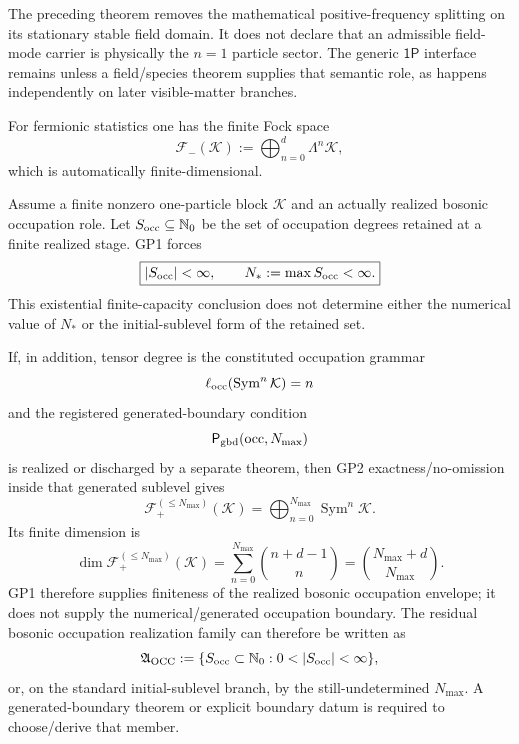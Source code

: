 \documentclass[12pt,a4paper]{article}
\begin{document}




\begin{remark}
The preceding theorem removes the mathematical positive-frequency splitting on
its stationary stable field domain.  It does not declare that an admissible
field-mode carrier is physically the \(n=1\) particle sector.  The generic
\(\mathsf{1P}\) interface remains unless a field/species theorem supplies
that semantic role, as happens independently on later visible-matter branches.
\end{remark}

For fermionic statistics one has the finite Fock space
\begin{equation}
\label{p4:eq:fermionic-fock}
\mathcal F_-(\mathcal K)
:=
\bigoplus_{n=0}^{d} \Lambda^n \mathcal K,
\end{equation}
which is automatically finite-dimensional.

\begin{theorem}
\label{p4:thm:gp1-bosonic-occupation-boundary}
Assume a finite nonzero one-particle block \(\mathcal K\) and an actually
realized bosonic occupation role.  Let \(S_{\rm occ}\subseteq\mathbb N_0\)
be the set of occupation degrees retained at a finite realized stage.  GP1
forces
\[
 \boxed{|S_{\rm occ}|<\infty,\qquad
 N_*:=\max S_{\rm occ}<\infty.}
\]
This existential finite-capacity conclusion does not determine either the
numerical value of \(N_*\) or the initial-sublevel form of the retained set.

If, in addition, tensor degree is the constituted occupation grammar
\[
 \ell_{\rm occ}(\operatorname{Sym}^n\mathcal K)=n
\]
and the registered generated-boundary condition
\[
 \mathsf P_{\rm gbd}(\mathrm{occ},N_{\max})
\]
is realized or discharged by a separate theorem, then GP2 exactness/no-omission
inside that generated sublevel gives
\begin{equation}
\label{p4:eq:bosonic-fock-cutoff}
 \boxed{
 \mathcal F_+^{(\le N_{\max})}(\mathcal K)
 =\bigoplus_{n=0}^{N_{\max}}\operatorname{Sym}^n\mathcal K.}
\end{equation}
Its finite dimension is
\[
 \dim\mathcal F_+^{(\le N_{\max})}(\mathcal K)
 =\sum_{n=0}^{N_{\max}}\binom{n+d-1}{n}
 =\binom{N_{\max}+d}{N_{\max}}.
\]
GP1 therefore supplies finiteness of the realized bosonic occupation envelope;
it does not supply the numerical/generated occupation boundary.  The residual
bosonic occupation realization family can therefore be written as
\[
 \mathfrak A_{\rm OCC}
 :=\{S_{\rm occ}\subset\mathbb N_0:0<|S_{\rm occ}|<\infty\},
\]
or, on the standard initial-sublevel branch, by the still-undetermined
\(N_{\max}\).  A generated-boundary theorem or explicit boundary datum is
required to choose/derive that member.
\end{theorem}
\end{document}
